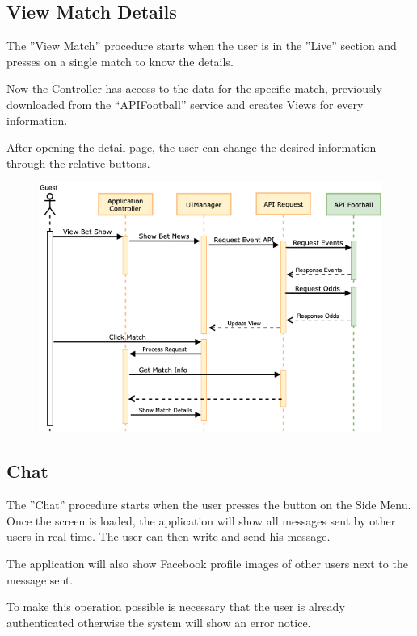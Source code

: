 \documentclass[numbers=noenddot, 12pt, a4paper, oneside]{scrbook}
\begin{document}
\newpage
\subsection*{View Match Details}
The ”View Match” procedure starts when the user is in the ”Live” section and presses on a single match to know the details.

Now the Controller has access to the data for the specific match, previously downloaded from the “APIFootball” service and creates Views for every information. 

After opening the detail page, the user can change the desired information through the relative buttons.

\begin{figure}[H]
	\centering
	\includegraphics[width=1\textwidth]{images/Sequence/SequenceMatchDetails}
\end{figure}

\newpage

\subsection*{Chat}
The ”Chat” procedure starts when the user presses the button on the Side Menu. Once the screen is loaded, the application will show all messages sent by other users in real time. The user can then write and send his message.

The application will also show Facebook profile images of other users next to the message sent.

To make this operation possible is necessary that the user is already authenticated otherwise the system will show an error notice.
\end{document}
